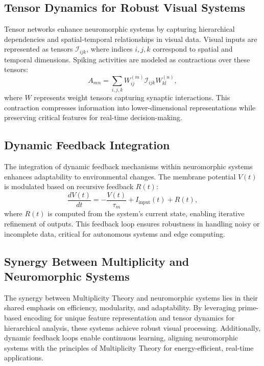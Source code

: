 \documentclass{article}
\theoremstyle{plain}
\begin{document}
\subsection{Tensor Dynamics for Robust Visual Systems}
Tensor networks enhance neuromorphic systems by capturing hierarchical dependencies and spatial-temporal relationships in visual data. Visual inputs are represented as tensors \( \mathcal{I}_{ijk} \), where indices \( i, j, k \) correspond to spatial and temporal dimensions. Spiking activities are modeled as contractions over these tensors:
\begin{equation}
A_{mn} = \sum_{i,j,k} W_{ij}^{(m)} \mathcal{I}_{ijk} W_{kl}^{(n)},
\end{equation}
where \( W \) represents weight tensors capturing synaptic interactions. This contraction compresses information into lower-dimensional representations while preserving critical features for real-time decision-making.

\subsection{Dynamic Feedback Integration}
The integration of dynamic feedback mechanisms within neuromorphic systems enhances adaptability to environmental changes. The membrane potential \( V(t) \) is modulated based on recursive feedback \( R(t) \):
\begin{equation}
\frac{dV(t)}{dt} = -\frac{V(t)}{\tau_m} + I_{\text{input}}(t) + R(t),
\end{equation}
where \( R(t) \) is computed from the system's current state, enabling iterative refinement of outputs. This feedback loop ensures robustness in handling noisy or incomplete data, critical for autonomous systems and edge computing.

\subsection{Synergy Between Multiplicity and Neuromorphic Systems}
The synergy between Multiplicity Theory and neuromorphic systems lies in their shared emphasis on efficiency, modularity, and adaptability. By leveraging prime-based encoding for unique feature representation and tensor dynamics for hierarchical analysis, these systems achieve robust visual processing. Additionally, dynamic feedback loops enable continuous learning, aligning neuromorphic systems with the principles of Multiplicity Theory for energy-efficient, real-time applications.
\end{document}
